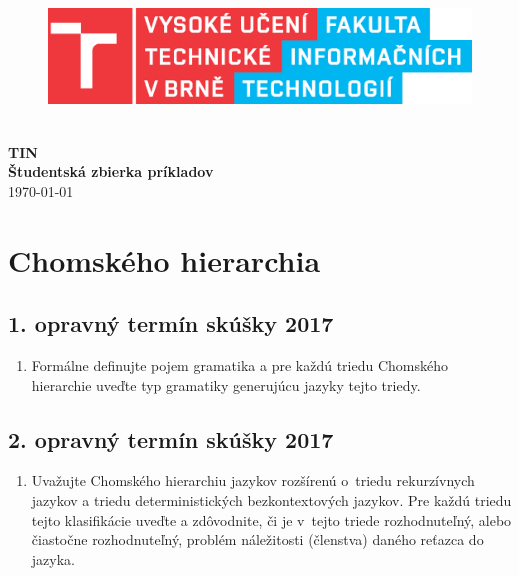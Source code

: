 \documentclass[11pt,a4paper]{article}
\begin{document}
	\begin{titlepage}
		\begin{center}
			\hfill\\[20em]
			\begin{figure}[H]
				\centering
				\includegraphics[scale=0.8]{logo.eps}
			\end{figure}
			\hfill\\[1em]
			\Huge{
				\textbf{
					TIN
				}
			}
			\hfill\\[1em]
			\huge{
				\textbf{
					Študentská zbierka príkladov
				}
			}
			\hfill\\[1em]
			\Large{
				\today
			}
		\end{center}
	\end{titlepage}
	\newpage

	\tableofcontents
	\newpage

	\section{Chomského hierarchia}

		\subsection{1. opravný termín skúšky 2017}

		\begin{enumerate}
			\item Formálne definujte pojem gramatika a pre každú triedu Chomského hierarchie uveďte typ gramatiky generujúcu jazyky tejto triedy.
		\end{enumerate}

		\subsection{2. opravný termín skúšky 2017}

		\begin{enumerate}
			\item Uvažujte Chomského hierarchiu jazykov rozšírenú o~triedu rekurzívnych jazykov a triedu deterministických bezkontextových jazykov. Pre každú triedu tejto klasifikácie uveďte a zdôvodnite, či je v~tejto triede rozhodnuteľný, alebo čiastočne rozhodnuteľný, problém náležitosti (členstva) daného reťazca do jazyka.
		\end{enumerate}
\end{document}

